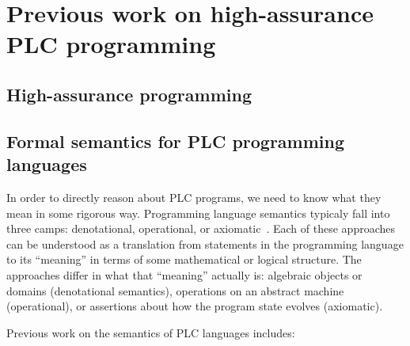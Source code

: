 \section{Previous work on high-assurance PLC programming}

\subsection{High-assurance programming}

\subsection{Formal semantics for PLC programming languages}

In order to directly reason about PLC programs, we need to know what they mean
in some rigorous way. Programming language semantics typicaly fall into three
camps: denotational, operational, or axiomatic~\cite{hoare:axiomatic}. Each of
these approaches can be understood as a translation from statements in the
programming language to its ``meaning'' in terms of some mathematical or logical
structure. The approaches differ in what that ``meaning'' actually is: algebraic
objects or domains (denotational semantics), operations on an abstract machine
(operational), or assertions about how the program state evolves (axiomatic).

Previous work on the semantics of PLC languages includes:


